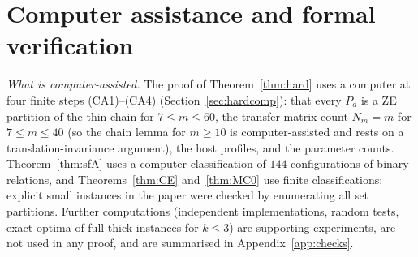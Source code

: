 \section{Computer assistance and formal verification}\label{sec:lean}
\emph{What is computer-assisted.} The proof of Theorem~\ref{thm:hard} uses a computer at four finite steps (CA1)--(CA4) (Section~\ref{sec:hardcomp}): that every $P_a$ is a ZE partition of the thin chain for $7\le m\le60$, the transfer-matrix count $N_m=m$ for $7\le m\le40$ (so the chain lemma for $m\ge10$ is computer-assisted and rests on a translation-invariance argument), the host profiles, and the parameter counts. Theorem~\ref{thm:sfA} uses a computer classification of $144$ configurations of binary relations, and Theorems~\ref{thm:CE} and~\ref{thm:MC0} use finite classifications; explicit small instances in the paper were checked by enumerating all set partitions. Further computations (independent implementations, random tests, exact optima of full thick instances for $k\le3$) are supporting experiments, are not used in any proof, and are summarised in Appendix~\ref{app:checks}.

